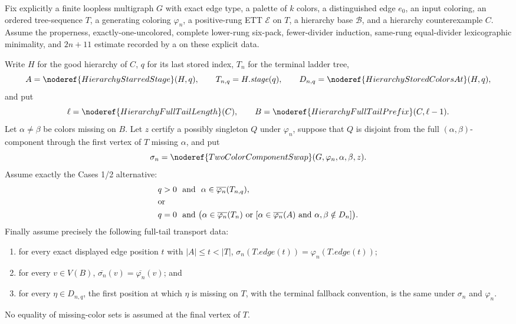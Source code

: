 \begin{lemma}
Fix explicitly a finite loopless multigraph \(G\) with exact edge type, a
palette of \(k\) colors, a distinguished edge \(e_0\), an input coloring,
an ordered tree-sequence \(T\), a generating coloring \(\varphi_n\), a
positive-rung ETT \(\mathcal E\) on \(T\), a hierarchy base \(\mathcal B\),
and a hierarchy counterexample \(C\).  Assume the properness,
exactly-one-uncolored, complete lower-rung six-pack, fewer-divider
induction, same-rung equal-divider lexicographic minimality, and
\(2n+11\) estimate recorded by a
 on these explicit data.

Write \(H\) for the good hierarchy of \(C\), \(q\) for its last stored
index, \(T_n\) for the terminal ladder tree,
\[
 A=\noderef{HierarchyStarredStage}(H,q),\qquad
 T_{n,q}=H.\mathit{stage}(q),\qquad
 D_{n,q}=\noderef{HierarchyStoredColorsAt}(H,q),
\]
and put
\[
 \ell=\noderef{HierarchyFullTailLength}(C),\qquad
 B=\noderef{HierarchyFullTailPrefix}(C,\ell-1).
\]
Let \(\alpha\ne\beta\) be colors missing on \(B\).  Let \(z\) certify a
possibly singleton  \(Q\) under
\(\varphi_n\), suppose that \(Q\) is disjoint from the full
\((\alpha,\beta)\)-component through the first vertex of \(T\) missing
\(\alpha\), and put
\[
 \sigma_n=\noderef{TwoColorComponentSwap}
       (G,\varphi_n,\alpha,\beta,z).
\]
Assume exactly the Cases 1/2 alternative:
\[
\begin{split}
 &q>0\ \hbox{ and }\ \alpha\in\overline{\varphi_n}(T_{n,q}),\\
 &\text{or}\\
 &q=0\ \hbox{ and }\bigl(\alpha\in\overline{\varphi_n}(T_n)
   \ \hbox{or}\ 
   [\alpha\in\overline{\varphi_n}(A)
     \text{ and }\alpha,\beta\notin D_n]\bigr).
\end{split}
\]
Finally assume precisely the following full-tail transport data:
\begin{enumerate}
\item for every exact displayed edge position \(t\) with
\(|A|\leq t<|T|\), \(\sigma_n(T.\mathit{edge}(t))=
\varphi_n(T.\mathit{edge}(t))\);
\item for every \(v\in V(B)\),
\(\overline{\sigma_n}(v)=\overline{\varphi_n}(v)\); and
\item for every \(\eta\in D_{n,q}\), the first position at which \(\eta\)
is missing on \(T\), with the terminal fallback convention, is the same
under \(\sigma_n\) and \(\varphi_n\).
\end{enumerate}
No equality of missing-color sets is assumed at the final vertex of \(T\).


\end{lemma}
